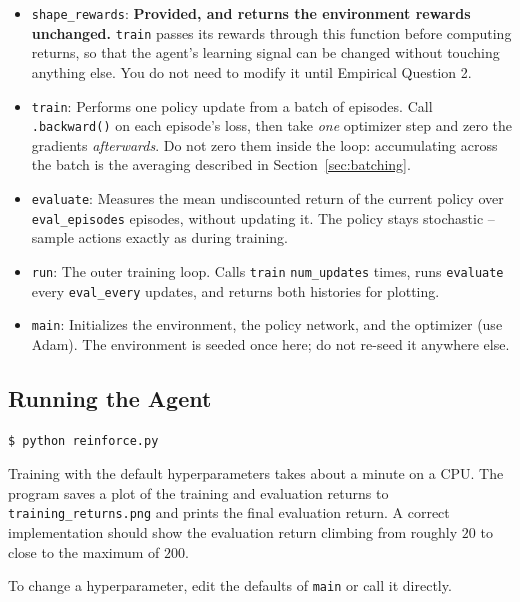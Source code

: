 \begin{itemize}
    \item \texttt{shape\_rewards}: \textbf{Provided, and returns the environment
    rewards unchanged.} \texttt{train} passes its rewards through this function
    before computing returns, so that the agent's learning signal can be changed
    without touching anything else. You do not need to modify it until
    Empirical Question 2.

    \item \texttt{train}: Performs one policy update from a batch of episodes.
    Call \verb|.backward()| on each episode's loss, then take \emph{one}
    optimizer step and zero the gradients \emph{afterwards}. Do not zero them
    inside the loop: accumulating across the batch is the averaging described in
    Section~\ref{sec:batching}.

    \item \texttt{evaluate}: Measures the mean undiscounted return of the current
    policy over \verb|eval_episodes| episodes, without updating it. The policy
    stays stochastic -- sample actions exactly as during training.

    \item \texttt{run}: The outer training loop. Calls \texttt{train}
    \verb|num_updates| times, runs \texttt{evaluate} every \verb|eval_every|
    updates, and returns both histories for plotting.

    \item \texttt{main}: Initializes the environment, the policy network, and the
    optimizer (use Adam). The environment is seeded once here; do not re-seed it
    anywhere else.

\end{itemize}

\subsection{Running the Agent}

\begin{lstlisting}[language=Shell]
$ python reinforce.py
\end{lstlisting}

Training with the default hyperparameters takes about a minute on a CPU.
The program saves a plot of the training and evaluation returns to
\texttt{training\_returns.png} and prints the final evaluation return. A correct
implementation should show the evaluation return climbing from roughly $20$ to
close to the maximum of $200$.

To change a hyperparameter, edit the defaults of \verb|main| or call it directly.

